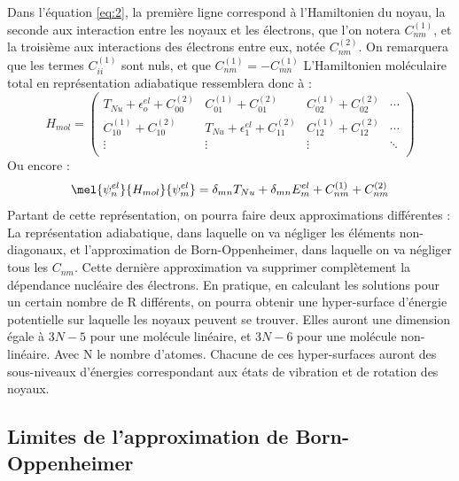 Dans l'équation \ref{eq:2}, la première ligne correspond à l'Hamiltonien du noyau, la seconde aux interaction entre les noyaux et les électrons, que l'on notera $C_{nm}^{(1)}$, et la troisième aux interactions des électrons entre eux, notée $C_{nm}^{(2)}$.\newline
On remarquera que les termes $C_{ii}^{(1)}$ sont nuls, et que $C_{nm}^{(1)} = - C_{mn}^{(1)}$
L'Hamiltonien moléculaire total en représentation adiabatique ressemblera donc à :
\begin{equation*}
    H_{mol} = 
    \begin{pmatrix}
    T_{Nu} + \epsilon_o^{el} + C_{00}^{(2)} & C_{01}^{(1)}+C_{01}^{(2)} & C_{02}^{(1)}+C_{02}^{(2)} & \cdots \\
    C_{10}^{(1)}+C_{10}^{(2)} & T_{Nu} + \epsilon_1^{el} + C_{11}^{(2)} & C_{12}^{(1)}+C_{12}^{(2)} & \cdots \\
    \vdots  & \vdots  & \vdots & \ddots  \\
    \end{pmatrix}
\end{equation*}
Ou encore : 
\begin{equation*}
    \mel{\psi^{el}_n}{H_{mol}}{\psi^{el}_m} = \delta_{mn}T_{Nu} + \delta_{mn}E_m^{el} + C_{nm}^{(1)} + C_{nm}^{(2)}
\end{equation*}
Partant de cette représentation, on pourra faire deux approximations différentes : \newline
La représentation adiabatique, dans laquelle on va négliger les éléments non-diagonaux, et l'approximation de Born-Oppenheimer, dans laquelle on va négliger tous les $C_{nm}$.\newline
Cette dernière approximation va supprimer complètement la dépendance nucléaire des électrons.\newline
En pratique, en calculant les solutions pour un certain nombre de R différents, on pourra obtenir une hyper-surface d'énergie potentielle sur laquelle les noyaux peuvent se trouver. Elles auront une dimension égale à $3N - 5$ pour une molécule linéaire, et $3N - 6$ pour une molécule non-linéaire. Avec N le nombre d'atomes. Chacune de ces hyper-surfaces auront des sous-niveaux d'énergies correspondant aux états de vibration et de rotation des noyaux.

\subsection{Limites de l'approximation de Born-Oppenheimer}

